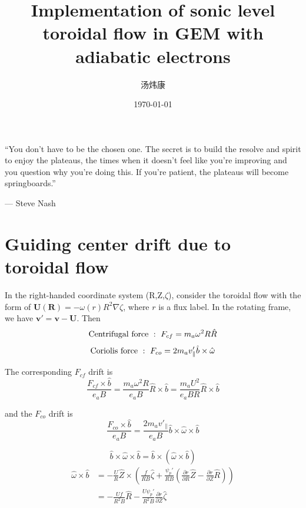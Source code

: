 \documentclass[12pt]{article}
\begin{document}
\begin{CJK*}{UTF8}{gbsn}
\title{\textbf{Implementation of sonic level toroidal flow in GEM with adiabatic electrons}}
\author{汤炜康}
\date{\today}
\maketitle
\tableofcontents
\newpage

``You don't have to be the chosen one. The secret is to build the resolve and spirit 
to enjoy the plateaus, the times when it doesn't feel like you're improving and you 
question why you're doing this. If you're patient, the plateaus will become springboards.''

{\hfill --- Steve Nash}

\newpage
\section{Guiding center drift due to toroidal flow}
In the right-handed coordinate system (R,Z,$\zeta$), consider the toroidal flow with the form of $\mathbf{U}(\mathbf{R}) = -\omega(r)R^2 \nabla \zeta$, where $r$ is a flux label.
In the rotating frame\cite{artun1994}, we have ${\mathbf v'=\mathbf v-\mathbf U}$. Then 
\begin{equation}
    {\rm Centrifugal\ force}\ :\ F_{cf} = m_a\omega^2R\hat{R}
\end{equation}
\begin{equation}
    {\rm Coriolis\ force}\ :\ F_{co} = 2m_av'_\parallel\hat{b}\times\hat{\omega}
\end{equation}

The corresponding $F_{cf}$ drift is
\begin{equation}
    \frac{F_{cf}\times\hat{b}}{e_aB} = \frac{m_a\omega^2R}{e_aB}\hat{R}\times\hat{b} = \frac{m_aU^2}{e_aBR}\hat{R}\times\hat{b}
\end{equation} 

and the $F_{co}$ drift is
\begin{equation}
    \frac{F_{co}\times\hat{b}}{e_aB} = \frac{2m_av'_\parallel}{e_aB} \hat{b}\times\hat{\omega}\times\hat{b}
\end{equation}

{\color{black}
\begin{equation}
    \hat{b}\times\hat{\omega}\times\hat{b} = \hat{b}\times(\hat{\omega}\times\hat{b})
\end{equation}
\begin{equation}
    \begin{split}
        \hat{\omega}\times\hat{b} &= -\frac{U}{R}\hat{Z}\times(\frac{f}{RB}\hat{\zeta} + \frac{\psi_p'}{RB}(\frac{\partial r}{\partial R}\hat{Z} - \frac{\partial r}{\partial Z}\hat{R}))\\
        &= -\frac{Uf}{R^2B}\hat{R} -\frac{U\psi_p'}{R^2B}\frac{\partial r}{\partial Z}\hat{\zeta}
    \end{split}
\end{equation}
}


\end{CJK*}
\end{document}
